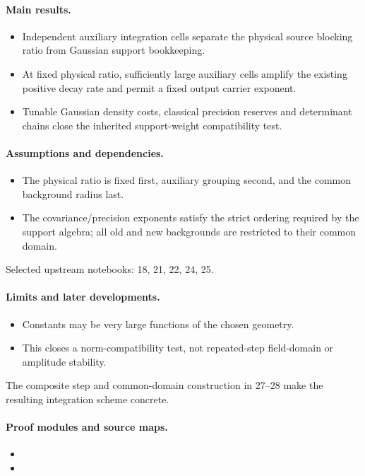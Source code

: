 \paragraph{Main results.}
\begin{itemize}
\item Independent auxiliary integration cells separate the physical source blocking ratio from Gaussian support bookkeeping.
\item At fixed physical ratio, sufficiently large auxiliary cells amplify the existing positive decay rate and permit a fixed output carrier exponent.
\item Tunable Gaussian density costs, classical precision reserves and determinant chains close the inherited support-weight compatibility test.
\end{itemize}

\paragraph{Assumptions and dependencies.}
\begin{itemize}
\item The physical ratio is fixed first, auxiliary grouping second, and the common background radius last.
\item The covariance/precision exponents satisfy the strict ordering required by the support algebra; all old and new backgrounds are restricted to their common domain.
\end{itemize}

Selected upstream notebooks: 18, 21, 22, 24, 25.\par

\paragraph{Limits and later developments.}
\begin{itemize}
\item Constants may be very large functions of the chosen geometry.
\item This closes a norm-compatibility test, not repeated-step field-domain or amplitude stability.
\end{itemize}

The composite step and common-domain construction in 27--28 make the resulting integration scheme concrete.

\paragraph{Proof modules and source maps.}
\begingroup\small
\begin{itemize}
\item {}
\item {}
\end{itemize}
\endgroup

